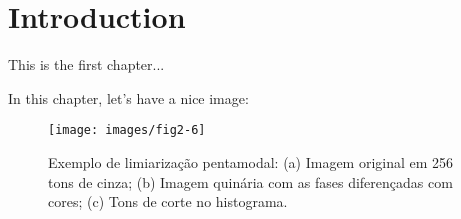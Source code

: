 
\chapter{Introduction}

This is the first chapter...

In this chapter, let's have a nice image:

\begin{figure} [h]
  \begin{center}
    \texttt{[image: images/fig2-6]}
    \caption{Exemplo de limiarização pentamodal: (a) Imagem original
      em 256 tons de cinza; (b) Imagem quinária com as fases
      diferençadas com cores; (c) Tons de corte no
      histograma.\cite{74}}\label{fig:2-6}
  \end{center}
\end{figure}
